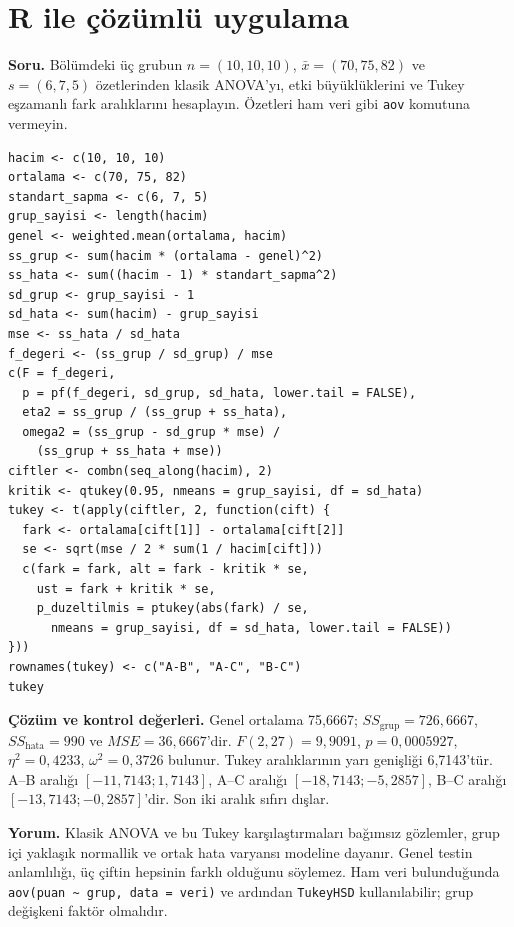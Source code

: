 \section{R ile çözümlü uygulama}
\label{sec:r-anova}

\textbf{Soru.} Bölümdeki üç grubun $n=(10,10,10)$,
$\bar x=(70,75,82)$ ve $s=(6,7,5)$ özetlerinden klasik ANOVA'yı,
etki büyüklüklerini ve Tukey eşzamanlı fark aralıklarını hesaplayın.
Özetleri ham veri gibi \texttt{aov} komutuna vermeyin.

\begin{lstlisting}[style=prismR]
hacim <- c(10, 10, 10)
ortalama <- c(70, 75, 82)
standart_sapma <- c(6, 7, 5)
grup_sayisi <- length(hacim)
genel <- weighted.mean(ortalama, hacim)
ss_grup <- sum(hacim * (ortalama - genel)^2)
ss_hata <- sum((hacim - 1) * standart_sapma^2)
sd_grup <- grup_sayisi - 1
sd_hata <- sum(hacim) - grup_sayisi
mse <- ss_hata / sd_hata
f_degeri <- (ss_grup / sd_grup) / mse
c(F = f_degeri,
  p = pf(f_degeri, sd_grup, sd_hata, lower.tail = FALSE),
  eta2 = ss_grup / (ss_grup + ss_hata),
  omega2 = (ss_grup - sd_grup * mse) /
    (ss_grup + ss_hata + mse))
ciftler <- combn(seq_along(hacim), 2)
kritik <- qtukey(0.95, nmeans = grup_sayisi, df = sd_hata)
tukey <- t(apply(ciftler, 2, function(cift) {
  fark <- ortalama[cift[1]] - ortalama[cift[2]]
  se <- sqrt(mse / 2 * sum(1 / hacim[cift]))
  c(fark = fark, alt = fark - kritik * se,
    ust = fark + kritik * se,
    p_duzeltilmis = ptukey(abs(fark) / se,
      nmeans = grup_sayisi, df = sd_hata, lower.tail = FALSE))
}))
rownames(tukey) <- c("A-B", "A-C", "B-C")
tukey
\end{lstlisting}

\begin{outputguidebox}
\textbf{Çözüm ve kontrol değerleri.} Genel ortalama 75,6667;
$SS_{\text{grup}}=726{,}6667$, $SS_{\text{hata}}=990$ ve
$MSE=36{,}6667$'dir. $F(2,27)=9{,}9091$, $p=0{,}0005927$,
$\eta^2=0{,}4233$, $\omega^2=0{,}3726$ bulunur. Tukey aralıklarının
yarı genişliği 6,7143'tür. A--B aralığı $[-11{,}7143;1{,}7143]$,
A--C aralığı $[-18{,}7143;-5{,}2857]$, B--C aralığı
$[-13{,}7143;-0{,}2857]$'dir. Son iki aralık sıfırı dışlar.
\end{outputguidebox}

\textbf{Yorum.} Klasik ANOVA ve bu Tukey karşılaştırmaları bağımsız
gözlemler, grup içi yaklaşık normallik ve ortak hata varyansı modeline dayanır.
Genel testin anlamlılığı, üç çiftin hepsinin farklı olduğunu söylemez.
Ham veri bulunduğunda \texttt{aov(puan \textasciitilde{} grup, data = veri)}
ve ardından \texttt{TukeyHSD} kullanılabilir; grup değişkeni faktör olmalıdır.

